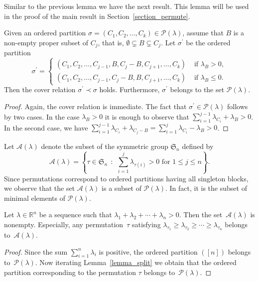 \documentclass[ALCO,ThmDefs,Unicode,epreuves]{cedram}
\newcommand{\Rrr}{\mathbb{R}}
\newcommand{\Sym}{\mathfrak{S}}
\newcommand{\coveredby}{\prec}
\newcommand{\lambdasumpositive}
{\lambda_{1} + \lambda_{2} + \cdots + \lambda_{n} > 0}
\begin{document}
Similar to the previous lemma we have the next result.
This lemma will be used in the proof of the main result
in Section~\ref{section_permute}.

\begin{lemma}
Given an ordered partition
$\sigma = (C_{1}, C_{2}, \ldots, C_{k}) \in \mathcal{P}(\lambda)$,
assume that $B$ is a non-empty proper subset of $C_{j}$,
that is,
$\emptyset \subsetneq B \subsetneq C_{j}$.
Let $\sigma^{\prime}$ be the ordered partition
$$
\sigma^{\prime}
=
\begin{cases}
(C_{1}, C_{2}, \ldots, C_{j-1}, B, C_{j} - B, C_{j+1}, \ldots, C_{k}) 
& \text{ if } \lambda_{B} > 0 , \\
(C_{1}, C_{2}, \ldots, C_{j-1}, C_{j} - B, B, C_{j+1}, \ldots, C_{k}) 
& \text{ if } \lambda_{B} \leq 0 . 
\end{cases}
$$
Then the cover relation $\sigma^{\prime} \coveredby \sigma$ holds.
Furthermore, $\sigma^{\prime}$ belongs to the set $\mathcal{P}(\lambda)$.
\label{lemma_split_block}
\end{lemma}
\begin{proof}
Again, the cover relation is immediate.
The fact that $\sigma^{\prime} \in \mathcal{P}(\lambda)$
follows by two cases.
In the case $\lambda_{B} > 0$
it is enough to observe that
$\sum_{i=1}^{j-1} \lambda_{C_{i}} + \lambda_{B} > 0$.
In the second case, we have
$\sum_{i=1}^{j-1} \lambda_{C_{i}} + \lambda_{C_{j} - B}
=
\sum_{i=1}^{j} \lambda_{C_{i}} - \lambda_{B}
 > 0$.
\end{proof}



Let $\mathcal{A}(\lambda)$ denote the subset
of the symmetric group $\Sym_{n}$
defined by
$$
\mathcal{A}(\lambda)
=
\left\{ \tau \in \Sym_{n} \:\: : \:\:
\sum_{i=1}^{j} \lambda_{\tau(i)} > 0 \text{ for } 1 \leq j\leq n \right\} .
$$
Since permutations correspond to ordered partitions
having all singleton blocks,
we observe that the set
$\mathcal{A}(\lambda)$ is a subset of
$\mathcal{P}(\lambda)$. In fact, it is the subset of minimal
elements of $\mathcal{P}(\lambda)$.


\begin{lemma}
Let $\lambda \in \Rrr^{n}$ be a sequence
such that $\lambdasumpositive$.
Then the set~$\mathcal{A}(\lambda)$ is nonempty.
Especially, any permutation~$\tau$
satisfying
$\lambda_{\tau_{1}} \geq \lambda_{\tau_{2}} \geq \cdots \geq \lambda_{\tau_{n}}$ 
belongs to~$\mathcal{A}(\lambda)$.
\end{lemma}
\begin{proof}
Since the sum $\sum_{i=1}^{n} \lambda_{i}$ is positive,
the ordered partition $([n])$ belongs 
to~$\mathcal{P}(\lambda)$.
Now iterating Lemma~\ref{lemma_split}
we obtain that the ordered partition corresponding to
the permutation $\tau$ 
belongs to~$\mathcal{P}(\lambda)$.
\end{proof}
\end{document}
